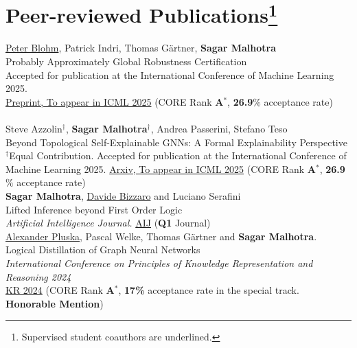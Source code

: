 \documentclass[10pt, a4paper]{article}
\newcommand{\years}[1]{\marginnote{\scriptsize #1}}
\begin{document}
\section*{Peer-reviewed Publications\protect\footnote{Supervised student coauthors are underlined.}}

\years{2025}\underline{Peter Blohm}, Patrick Indri, Thomas Gärtner, \textbf{Sagar Malhotra}\\ 
Probably Approximately Global Robustness Certification\\
Accepted for publication at the International Conference of Machine Learning 2025. \\
\href{https://countinglogic.github.io/files/Preprint.pdf}{Preprint, To appear in ICML 2025} (CORE Rank \textbf{A$^{*}$}, \textbf{26.9$\%$} acceptance rate) \\ \\  
\years{2025} Steve Azzolin$^{\dagger}$, \textbf{Sagar Malhotra}$^{\dagger}$, Andrea Passerini, Stefano Teso\\
Beyond Topological Self-Explainable GNNs: A Formal Explainability Perspective\\
$^{\dagger}$Equal Contribution. Accepted for publication at the International Conference of Machine Learning 2025. \href{https://arxiv.org/abs/2502.02719}{Arxiv, To appear in ICML 2025} (CORE Rank \textbf{A$^{*}$}, \textbf{26.9$\%$} acceptance rate)\\ 


\years{2025}\textbf{Sagar Malhotra}, \underline{Davide Bizzaro} and Luciano Serafini\\
Lifted Inference beyond First Order Logic \\
\emph{Artificial Intelligence Journal.} \href{https://doi.org/10.1016/j.artint.2025.104310}{AIJ} (\textbf{Q1} Journal)\\ 


\years{2024}\underline{Alexander Pluska}, Pascal Welke, Thomas G{\"a}rtner and \textbf{Sagar Malhotra}.\\
Logical Distillation of Graph Neural Networks\\
\emph{International Conference on Principles of Knowledge Representation and Reasoning 2024} \\
\href{https://arxiv.org/abs/2406.07126}{KR 2024} (CORE Rank \textbf{A$^{*}$}, \textbf{17\%} acceptance rate in the special track.  \textbf{Honorable Mention})\\
\end{document}
